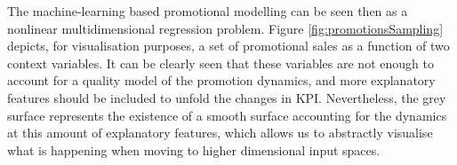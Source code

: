\documentclass{ieeeaccess}
\begin{document}
The machine-learning based promotional modelling can be seen then as a nonlinear multidimensional regression problem. Figure \ref{fig:promotionsSampling} depicts, for visualisation purposes, a set of promotional sales as a function of two context variables. It can be clearly seen that these variables are not enough to account for a quality model of the promotion dynamics, and more explanatory features should be included to unfold the changes in KPI. Nevertheless, the grey surface represents the existence of a smooth surface accounting for the dynamics at this amount of explanatory features, which allows us to abstractly visualise what is happening when moving to higher dimensional input spaces.










\end{document}
